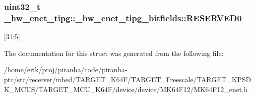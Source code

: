 \subsubsection[{\texorpdfstring{R\+E\+S\+E\+R\+V\+E\+D0}{RESERVED0}}]{\setlength{\rightskip}{0pt plus 5cm}uint32\+\_\+t \+\_\+hw\+\_\+enet\+\_\+tipg\+::\+\_\+hw\+\_\+enet\+\_\+tipg\+\_\+bitfields\+::\+R\+E\+S\+E\+R\+V\+E\+D0}\hypertarget{struct__hw__enet__tipg_1_1__hw__enet__tipg__bitfields_a635d255035875c80594b5ff39b56a705}{}\label{struct__hw__enet__tipg_1_1__hw__enet__tipg__bitfields_a635d255035875c80594b5ff39b56a705}
\mbox{[}31\+:5\mbox{]} 

The documentation for this struct was generated from the following file\+:\begin{DoxyCompactItemize}
\item 
/home/erik/proj/piranha/code/piranha-\/ptc/src/receiver/mbed/\+T\+A\+R\+G\+E\+T\+\_\+\+K64\+F/\+T\+A\+R\+G\+E\+T\+\_\+\+Freescale/\+T\+A\+R\+G\+E\+T\+\_\+\+K\+P\+S\+D\+K\+\_\+\+M\+C\+U\+S/\+T\+A\+R\+G\+E\+T\+\_\+\+M\+C\+U\+\_\+\+K64\+F/device/device/\+M\+K64\+F12/M\+K64\+F12\+\_\+enet.\+h\end{DoxyCompactItemize}
